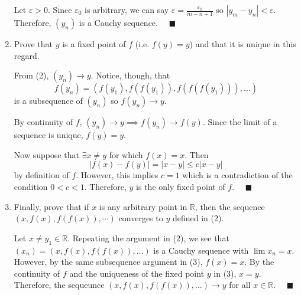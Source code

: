 \documentclass[12pt]{article}
\newcommand{\R}{\mathbb{R}}
\newcommand{\qed}{\quad \blacksquare}
\newcommand{\abs}[1]{\left\vert #1 \right\vert}
\newcommand{\ep}{\varepsilon}
\begin{document}
\begin{enumerate}
            Let $\ep > 0$. Since $\ep_0$ is arbitrary, we can say $\ep = \frac{\ep_0}{m -n + 1}$ so $\abs{y_m - y_n} < \ep$. Therefore, $(y_n)$ is a Cauchy sequence. $\qed$        
        \color{black}

	\item Prove that $y$ is a fixed point of $f$ (i.e. $f(y)=y$) and that it is unique in this regard.
	
        \color{blue}
            From (2), $(y_n) \to y$. Notice, though, that 
            \[f(y_n) = (f(y_1), f(f(y_1)), f(f(f(y_1))), \dots)\]
            is a subsequence of $(y_n)$ so $f(y_n) \to y$. 

            By continuity of $f$, $(y_n) \to y \implies f(y_n) \to f(y)$. Since the limit of a sequence is unique, $f(y) = y$. 

            Now suppose that $\exists x\neq y$ for which $f(x) = x$. Then 
            \[\abs{f(x) - f(y)} = \abs{x - y} \leq c\abs{x - y}\]
            by definition of $f$. However, this implies $c= 1$ which is a contradiction of the condition $0 < c < 1$. Therefore, $y$ is the only fixed point of $f$. $\qed$
        \color{black}

	\item Finally, prove that if $x$ is any arbitrary point in $\mathbb{R}$, then the sequence $(x, f(x),f(f(x)),\cdots )$ converges to $y$ defined in (2).
	
        \color{blue}
            Let $x \neq y_1 \in \R$. Repeating the argument in (2), we see that $(x_n) = (x, f(x), f(f(x)), \dots)$ is a Cauchy sequence with $\lim x_n = x$. However, by the same subsequence argument in (3), $f(x) = x$. By the continuity of $f$ and the uniqueness of the fixed point $y$ in (3), $x = y$. Therefore, the sequeunce $(x, f(x), f(f(x)), \dots) \to y$ for all $x \in \R$. $\qed$
        \color{black}

\end{enumerate}

\pagebreak
\end{document}
